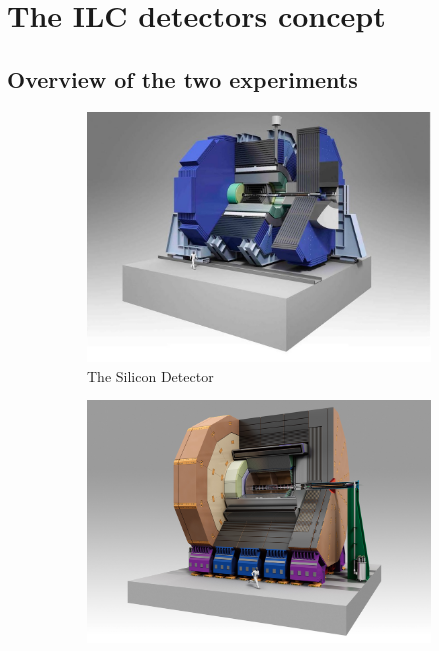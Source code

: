 

  \section{The ILC detectors concept}
  \label{sec:detectors}

    \subsection{Overview of the two experiments}
    
    \begin{figure}[!h]
      \centering
      \begin{subfigure}[t]{0.5\textwidth}
        \includegraphics[width = \textwidth]{Pictures/ILC/SiD.jpg}
        \caption{\label{fig:SiD} The Silicon Detector}
      \end{subfigure}
      \begin{subfigure}[t]{0.5\textwidth}
        \includegraphics[width = 1.03\textwidth]{Pictures/ILC/ILD.jpg}

\end{subfigure}
\end{figure}
